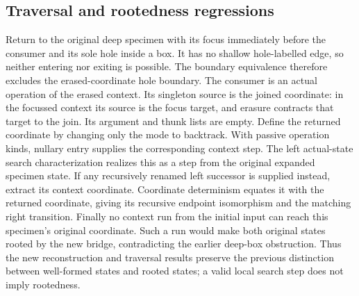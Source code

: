 \subsection{Traversal and rootedness regressions}
Return to the original deep specimen with its focus immediately before the
consumer and its sole hole inside a box. It has no shallow hole-labelled edge,
so neither entering nor exiting is possible. The boundary equivalence therefore
excludes the erased-coordinate hole boundary.
The consumer is an actual operation of the erased context. Its singleton source
is the joined coordinate: in the focussed context its source is the focus target,
and erasure contracts that target to the join. Its argument and thunk lists
are empty. Define the returned coordinate by changing only the mode to
backtrack. With passive operation kinds, nullary entry supplies the corresponding
context step.
The left actual-state search characterization realizes this as a step from the
original expanded specimen state. If any recursively renamed left successor is
supplied instead, extract its context coordinate. Coordinate determinism equates
it with the returned coordinate, giving its recursive endpoint isomorphism and
the matching right transition.
Finally no context run from the initial input can reach this specimen's original
coordinate. Such a run would make both original states rooted by the new bridge,
contradicting the earlier deep-box obstruction. Thus the new reconstruction and
traversal results preserve the previous distinction between well-formed states
and rooted states; a valid local search step does not imply rootedness.
